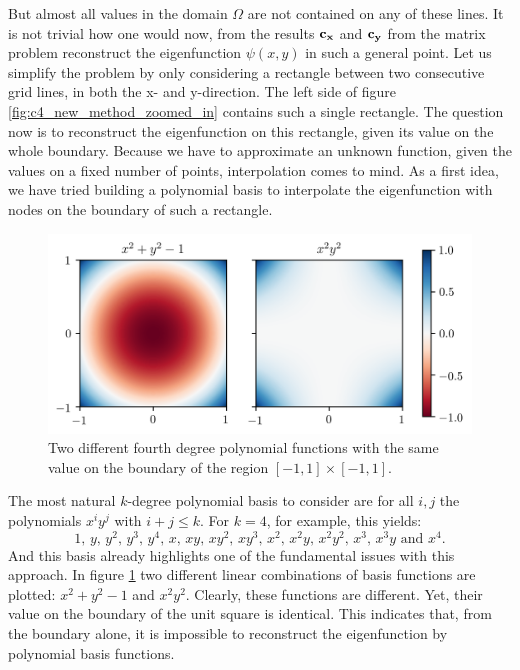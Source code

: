 But almost all values in the domain $\Omega$ are not contained on any of these lines. It is not trivial how one would now, from the results $\vb{c_x}$ and $\vb{c_y}$ from the matrix problem reconstruct the eigenfunction $\psi(x, y)$ in such a general point. Let us simplify the problem by only considering a rectangle between two consecutive grid lines, in both the x- and y-direction. The left side of figure \ref{fig:c4_new_method_zoomed_in} contains such a single rectangle. The question now is to reconstruct the eigenfunction on this rectangle, given its value on the whole boundary. Because we have to approximate an unknown function, given the values on a fixed number of points, interpolation comes to mind. As a first idea, we have tried building a polynomial basis to interpolate the eigenfunction with nodes on the boundary of such a rectangle.

\begin{figure}
    \begin{center}
        \includegraphics*[width=1\textwidth]{img/chapter4/nm_interpolation.png}
    \end{center}
    \caption{Two different fourth degree polynomial functions with the same value on the boundary of the region $[-1, 1] \times [-1, 1]$.}\label{fig:c4_interpolation_boundary issue}
\end{figure}

The most natural $k$-degree polynomial basis to consider are for all $i, j$ the polynomials $x^i y^j$ with $i + j \leq k$. For $k = 4$, for example, this yields:
$$
    1\text{, } y\text{, } y^2\text{, } y^3\text{, } y^4\text{, } x\text{, } x y\text{, } x y^2\text{, } x y^3\text{, } x^2\text{, } x^2 y\text{, } x^2 y^2\text{, } x^3\text{, } x^3 y\text{ and } x^4\text{.}
$$
And this basis already highlights one of the fundamental issues with this approach. In figure \ref{fig:c4_interpolation_boundary issue} two different linear combinations of basis functions are plotted: $x^2 + y^2 -1$ and $x^2y^2$. Clearly, these functions are different. Yet, their value on the boundary of the unit square is identical. This indicates that, from the boundary alone, it is impossible to reconstruct the eigenfunction by polynomial basis functions.

